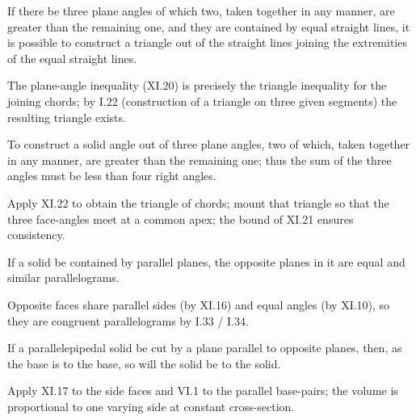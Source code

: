 \begin{claim}
\label{prop:XI.22}
If there be three plane angles of which two, taken together in any
manner, are greater than the remaining one, and they are contained
by equal straight lines, it is possible to construct a triangle out
of the straight lines joining the extremities of the equal straight
lines.
\end{claim}
\begin{evidence}[Proof of XI.22]
\label{ev:XI.22}
The plane-angle inequality (XI.20) is precisely the triangle
inequality for the joining chords; by I.22 (construction of a
triangle on three given segments) the resulting triangle exists.
\end{evidence}

\begin{claim}
\label{prop:XI.23}
To construct a solid angle out of three plane angles, two of which,
taken together in any manner, are greater than the remaining one;
thus the sum of the three angles must be less than four right angles.
\end{claim}
\begin{evidence}[Proof of XI.23]
\label{ev:XI.23}
Apply XI.22 to obtain the triangle of chords; mount that triangle so
that the three face-angles meet at a common apex; the bound of XI.21
ensures consistency.
\end{evidence}

\begin{claim}
\label{prop:XI.24}
If a solid be contained by parallel planes, the opposite planes in
it are equal and similar parallelograms.
\end{claim}
\begin{evidence}[Proof of XI.24]
\label{ev:XI.24}
Opposite faces share parallel sides (by XI.16) and equal angles (by
XI.10), so they are congruent parallelograms by I.33 / I.34.
\end{evidence}

\begin{claim}
\label{prop:XI.25}
If a parallelepipedal solid be cut by a plane parallel to opposite
planes, then, as the base is to the base, so will the solid be to
the solid.
\end{claim}
\begin{evidence}[Proof of XI.25]
\label{ev:XI.25}
Apply XI.17 to the side faces and VI.1 to the parallel base-pairs;
the volume is proportional to one varying side at constant
cross-section.
\end{evidence}

